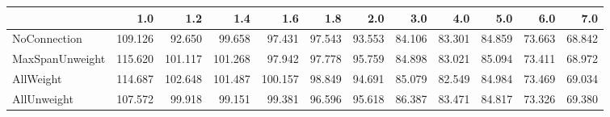 \begin{tabular}{lrrrrrrrrrrr}
\toprule
{} &     1.0 &     1.2 &     1.4 &     1.6 &    1.8 &    2.0 &    3.0 &    4.0 &    5.0 &    6.0 &    7.0 \\
\midrule
NoConnection    & 109.126 &  92.650 &  99.658 &  97.431 & 97.543 & 93.553 & 84.106 & 83.301 & 84.859 & 73.663 & 68.842 \\
MaxSpanUnweight & 115.620 & 101.117 & 101.268 &  97.942 & 97.778 & 95.759 & 84.898 & 83.021 & 85.094 & 73.411 & 68.972 \\
AllWeight       & 114.687 & 102.648 & 101.487 & 100.157 & 98.849 & 94.691 & 85.079 & 82.549 & 84.984 & 73.469 & 69.034 \\
AllUnweight     & 107.572 &  99.918 &  99.151 &  99.381 & 96.596 & 95.618 & 86.387 & 83.471 & 84.817 & 73.326 & 69.380 \\
\bottomrule
\end{tabular}
